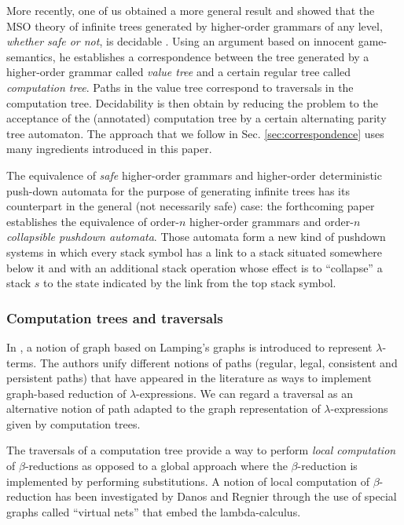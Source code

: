 \documentclass{llncs}
\begin{document}
More recently, one of us obtained a more general result and showed
that the MSO theory of infinite trees generated by higher-order
grammars of any level, \emph{whether safe or not}, is decidable
\cite{OngLics2006}.  Using an argument based on innocent
game-semantics, he establishes a correspondence between the tree
generated by a higher-order grammar called \emph{value tree} and a
certain regular tree called \emph{computation tree}. Paths in the
value tree correspond to traversals in the computation tree.
Decidability is then obtain by reducing the problem to the acceptance
of the (annotated) computation tree by a certain alternating parity
tree automaton.  The approach that we follow in
Sec. \ref{sec:correspondence} uses many ingredients introduced in this
paper.


The equivalence of \emph{safe} higher-order grammars and higher-order
deterministic push-down automata for the purpose of generating
infinite trees \cite{KNU02} has its counterpart in the general (not
necessarily safe) case: the forthcoming paper \cite{hague-sto07}
establishes the equivalence of order-$n$ higher-order grammars and
order-$n$ \emph{collapsible pushdown automata}. Those automata form a
new kind of pushdown systems in which every stack symbol has a link to
a stack situated somewhere below it and with an additional stack
operation whose effect is to ``collapse'' a stack $s$ to the state
indicated by the link from the top stack symbol.

\subsubsection{Computation trees and traversals}

In \cite{DBLP:conf/lics/AspertiDLR94}, a notion of graph based on
Lamping's graphs \cite{lamping} is introduced to represent
$\lambda$-terms. The authors unify different notions of paths
(regular, legal, consistent and persistent paths) that have appeared
in the literature as ways to implement graph-based reduction of
$\lambda$-expressions. We can regard a traversal as an alternative
notion of path adapted to the graph representation of
$\lambda$-expressions given by computation trees.

The traversals of a computation tree provide a way to perform
\emph{local computation} of $\beta$-reductions as opposed to a global
approach where the $\beta$-reduction is implemented by performing
substitutions. A notion of local computation of $\beta$-reduction has
been investigated by Danos and Regnier
\cite{DanosRegnier-Localandasynchronou} through the use of special
graphs called ``virtual nets'' that embed the lambda-calculus.
\end{document}
